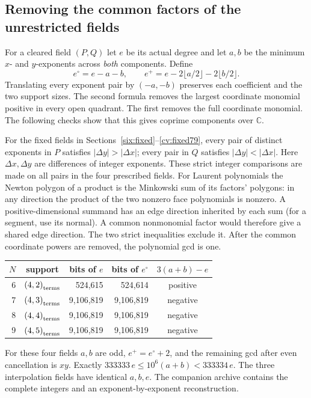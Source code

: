 \subsection{Removing the common factors of the unrestricted fields}\label{sup:primitive-fields}
For a cleared field \((P,Q)\) let \(e\) be its actual degree and let \(a,b\) be the minimum \(x\)- and \(y\)-exponents across \emph{both} components. Define
\[
 e^\circ=e-a-b,\qquad
 e^+=e-2\lfloor a/2\rfloor-2\lfloor b/2\rfloor .
\]
Translating every exponent pair by \((-a,-b)\) preserves each coefficient and the two support sizes. The second formula removes the largest coordinate monomial positive in every open quadrant. The first removes the full coordinate monomial. The following checks show that this gives coprime components over \(\mathbb C\).

For the fixed fields in Sections~\ref{six:fixed}--\ref{cv:fixed79}, every pair of distinct exponents in \(P\) satisfies \(|\Delta y|>|\Delta x|\); every pair in \(Q\) satisfies \(|\Delta y|<|\Delta x|\). Here \(\Delta x,\Delta y\) are differences of integer exponents. These strict integer comparisons are made on all pairs in the four prescribed fields. For Laurent polynomials the Newton polygon of a product is the Minkowski sum of its factors' polygons: in any direction the product of the two nonzero face polynomials is nonzero. A positive-dimensional summand has an edge direction inherited by each sum (for a segment, use its normal). A common nonmonomial factor would therefore give a shared edge direction. The two strict inequalities exclude it. After the common coordinate powers are removed, the polynomial gcd is one.

\begin{center}\small
\begin{tabular}{@{}rcrrc@{}}\toprule
\(N\)&support&bits of \(e\)&bits of \(e^\circ\)&\(3(a+b)-e\)\\\midrule
6&\(\left(4,2\right)_{\mathrm{terms}}\)&524,615&524,614&positive\\
7&\(\left(4,3\right)_{\mathrm{terms}}\)&9,106,819&9,106,819&negative\\
8&\(\left(4,4\right)_{\mathrm{terms}}\)&9,106,819&9,106,819&negative\\
9&\(\left(4,5\right)_{\mathrm{terms}}\)&9,106,819&9,106,819&negative\\\bottomrule
\end{tabular}
\end{center}
For these four fields \(a,b\) are odd, \(e^+=e^\circ+2\), and the remaining gcd after even cancellation is \(xy\). Exactly \(333333\,e\le10^6(a+b)<333334\,e\). The three interpolation fields have identical \(a,b,e\). The companion archive \cite{LuReplay} contains the complete integers and an exponent-by-exponent reconstruction.

